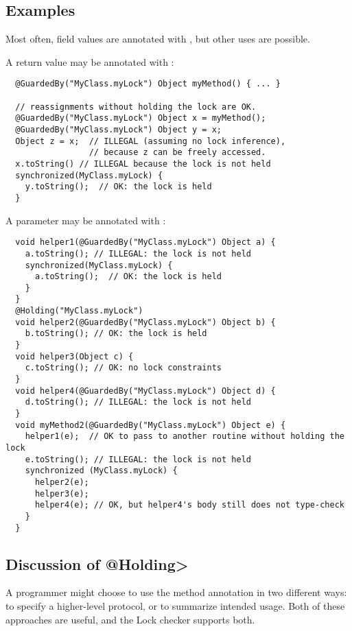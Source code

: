 \subsection{Examples}

Most often, field values are annotated with , but other
uses are possible.

A return value may be annotated with :

\begin{Verbatim}
  @GuardedBy("MyClass.myLock") Object myMethod() { ... }

  // reassignments without holding the lock are OK.
  @GuardedBy("MyClass.myLock") Object x = myMethod();
  @GuardedBy("MyClass.myLock") Object y = x;
  Object z = x;  // ILLEGAL (assuming no lock inference),
                 // because z can be freely accessed.
  x.toString() // ILLEGAL because the lock is not held
  synchronized(MyClass.myLock) {
    y.toString();  // OK: the lock is held
  }
\end{Verbatim}

A parameter may be annotated with :

\begin{Verbatim}
  void helper1(@GuardedBy("MyClass.myLock") Object a) {
    a.toString(); // ILLEGAL: the lock is not held
    synchronized(MyClass.myLock) {
      a.toString();  // OK: the lock is held
    }
  }
  @Holding("MyClass.myLock")
  void helper2(@GuardedBy("MyClass.myLock") Object b) {
    b.toString(); // OK: the lock is held
  }
  void helper3(Object c) {
    c.toString(); // OK: no lock constraints
  }
  void helper4(@GuardedBy("MyClass.myLock") Object d) {
    d.toString(); // ILLEGAL: the lock is not held
  }
  void myMethod2(@GuardedBy("MyClass.myLock") Object e) {
    helper1(e);  // OK to pass to another routine without holding the lock
    e.toString(); // ILLEGAL: the lock is not held
    synchronized (MyClass.myLock) {
      helper2(e);
      helper3(e);
      helper4(e); // OK, but helper4's body still does not type-check
    }
  }
\end{Verbatim}


    

\subsection{Discussion of \<@Holding>}

A programmer might choose to use the  method annotation in
two different ways:  to specify a higher-level protocol, or to summarize
intended usage.  Both of these approaches are useful, and the Lock checker
supports both.


